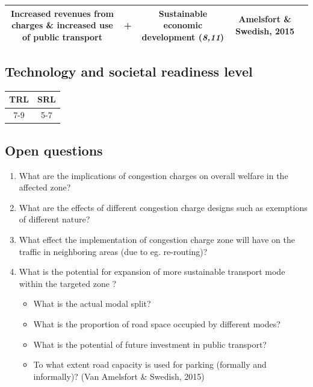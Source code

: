 \documentclass[
]{book}
\providecommand{\tightlist}{%
  \setlength{\itemsep}{0pt}\setlength{\parskip}{0pt}}
\begin{document}
\begin{longtable}[]{@{}ccccc@{}}
\begin{minipage}[t]{0.16\columnwidth}
Increased revenues from charges \& increased use of public transport\strut
\end{minipage} & \begin{minipage}[t]{0.17\columnwidth}\centering
\textbf{+}\strut
\end{minipage} & \begin{minipage}[t]{0.17\columnwidth}\centering
Sustainable economic development (\emph{8,11})\strut
\end{minipage} & \begin{minipage}[t]{0.17\columnwidth}\centering
Amelsfort \& Swedish, 2015\strut
\end{minipage}\tabularnewline
\bottomrule
\end{longtable}

\hypertarget{technology-and-societal-readiness-level-6}{%
\subsection*{Technology and societal readiness level}\label{technology-and-societal-readiness-level-6}}

\begin{longtable}[]{@{}cc@{}}
\toprule
TRL & SRL\tabularnewline
\midrule
\endhead
7-9 & 5-7\tabularnewline
\bottomrule
\end{longtable}

\hypertarget{open-questions-6}{%
\subsection*{Open questions}\label{open-questions-6}}

\begin{enumerate}
\def\labelenumi{\arabic{enumi}.}
\tightlist
\item
  What are the implications of congestion charges on overall welfare in the affected zone?
\item
  What are the effects of different congestion charge designs such as exemptions of different nature?
\item
  What effect the implementation of congestion charge zone will have on the traffic in neighboring areas (due to eg. re-routing)?
\item
  What is the potential for expansion of more sustainable transport mode within the targeted zone ?

  \begin{itemize}
  \tightlist
  \item
    What is the actual modal split?
  \item
    What is the proportion of road space occupied by different modes?
  \item
    What is the potential of future investment in public transport?
  \item
    To what extent road capacity is used for parking (formally and informally)? (Van Amelsfort \& Swedish, 2015)
  \end{itemize}
\end{enumerate}
\end{document}
